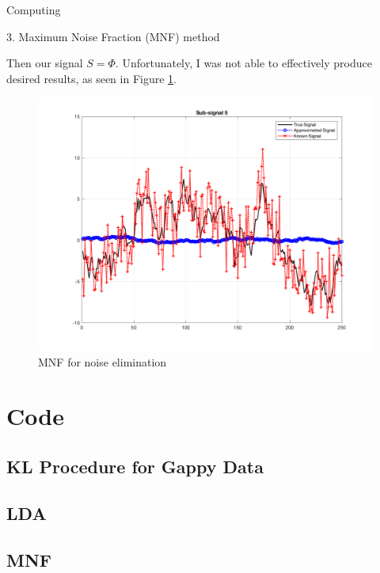 \begin{section}{Computing}
\begin{homeworkSection}{3. Maximum Noise Fraction (MNF) method}
{    Then our signal $S = \Phi$. Unfortunately, I was not able to effectively produce desired results, as seen in Figure \ref{fig:mnf}.

    \begin{minipage}{1.0\textwidth}
        \begin{figure}[H]
        \centering
        \includegraphics[trim={0cm 1cm 0cm 1cm},clip,width=0.60\columnwidth]{../data/MNF}
        \caption{MNF for noise elimination}
        \label{fig:mnf}
        \end{figure}
    \end{minipage}
}

\end{homeworkSection}

\end{section}

\appendix

\section{Code}\label{code}

\subsection{KL Procedure for Gappy Data}


\subsection{LDA}


\subsection{MNF}



